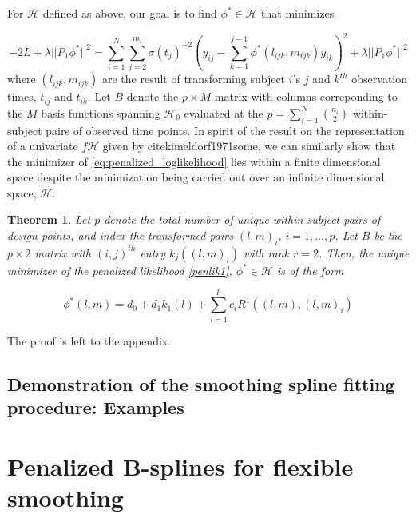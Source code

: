 \documentclass[12pt]{article}
\newtheorem{theorem}{Theorem}[section]
\theoremstyle{definition}
\begin{document}
For $\mathcal{H}$ defined as above, our goal is to find $\phi^* \in \mathcal{H}$  that minimizes 

\begin{equation} \label{eq:penalized_loglikelihood}
-2L + \lambda \vert \vert P_1 \phi^* \vert \vert^2 =  \sum_{i=1}^N \sum_{j=2}^{m_i} \sigma\left({t_j}\right)^{-2} \left(y_{ij} - \sum_{k=1}^{j-1}\phi^*\left({l_{ijk},m_{ijk}}\right)y_{ik} \right)^2 + \lambda  \vert \vert P_1 \phi^* \vert \vert^2
\end{equation}
\noindent
where $\left(l_{ijk}, m_{ijk}\right)$ are the result of transforming subject $i$'s $j$ and $k^{th}$ observation times, $t_{ij}$ and $t_{ik}$.  Let  $B$ denote the $p \times M$  matrix  with columns correponding to the $M$ basis functions spanning $\mathcal{H}_0$ evaluated at the $p = \sum_{i=1}^N {n_i \choose 2}$ within-subject pairs of observed time points.  In spirit of the result on the representation of a univariate $f \mathcal{H}$ given by cite{kimeldorf1971some}, we can similarly show that the minimizer of \ref{eq:penalized_loglikelihood} lies within a finite dimensional space despite the minimization being carried out over an infinite dimensional space, $\mathcal{H}$. 

\begin{theorem} \label{phi_representer_thm}
Let $p$ denote the total number of unique within-subject pairs of design points, and index the transformed pairs $\left( l,m \right)_i$, $i=1, \dots,p$. Let $B$ be the $p \times 2$ matrix with $\left(i,j\right)^{th}$ entry $k_j\left( \left( l,m \right)_i \right)$ with rank $r=2$. Then, the unique minimizer of the penalized likelihood \eqref{penlik1}, $\phi^* \in \mathcal{H}$ is of the form

\begin{equation}
\phi^*\left(l,m\right) = d_0 + d_1 k_1\left(l\right) + \sum_{i=1}^{p} c_i R^1\left( \left(l,m\right) , \left(l,m \right)_i\right)
 \label{eq:finitedimsolution}
\end{equation}
\end{theorem}

The proof is left to the appendix. 

\subsection{Demonstration of the smoothing spline fitting procedure: Examples}

\section{Penalized B-splines for flexible smoothing}
\end{document}
